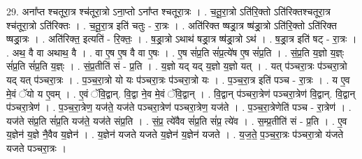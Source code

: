 \documentclass[17pt]{extarticle}
\begin{document}
29. अना᳚प्त श्चतूरा॒त्र श्च॑तूरा॒त्रो ऽना॒प्तो ऽना᳚प्त श्चतूरा॒त्रः । . च॒तू॒रा॒त्रो ऽति॑रि॒क्तो ऽति॑रिक्तश्चतूरा॒त्र श्च॑तूरा॒त्रो ऽति॑रिक्तः । . च॒तू॒रा॒त्र इति॑ चतुः - रा॒त्रः । . अति॑रिक्त ष्षड्रा॒त्र ष्ष॑ड्रा॒त्रो ऽति॑रि॒क्तो ऽति॑रिक्त ष्षड्रा॒त्रः । . अति॑रिक्त॒ इत्यति॑ - रि॒क्तः॒ । . ष॒ड्रा॒त्रो ऽथाथ॑ षड्रा॒त्र ष्ष॑ड्रा॒त्रो ऽथ॑ । . ष॒ड्रा॒त्र इति॑ षट् - रा॒त्रः । . अथ॒ वै वा अथाथ॒ वै । . वा ए॒ष ए॒ष वै वा ए॒षः । . ए॒ष सं॑प्र॒ति सं॑प्र॒त्ये॑ष ए॒ष सं॑प्र॒ति । . सं॒प्र॒ति य॒ज्ञो य॒ज्ञ्ः सं॑प्र॒ति सं॑प्र॒ति य॒ज्ञ्ः । . सं॒प्र॒तीति॑ सं - प्र॒ति । . य॒ज्ञो यद् यद् य॒ज्ञो य॒ज्ञो यत् । . यत् प॑ञ्चरा॒त्रः प॑ञ्चरा॒त्रो यद् यत् प॑ञ्चरा॒त्रः । . प॒ञ्च॒रा॒त्रो यो यः प॑ञ्चरा॒त्रः प॑ञ्चरा॒त्रो यः । . प॒ञ्च॒रा॒त्र इति॑ पञ्च - रा॒त्रः । . य ए॒व मे॒वं ॅयो य ए॒वम् । . ए॒वं ॅवि॒द्वान्. वि॒द्वा ने॒व मे॒वं ॅवि॒द्वान् । . वि॒द्वान् प॑ञ्चरा॒त्रेण॑ पञ्चरा॒त्रेण॑ वि॒द्वान्. वि॒द्वान् प॑ञ्चरा॒त्रेण॑ । . प॒ञ्च॒रा॒त्रेण॒ यज॑ते॒ यज॑ते पञ्चरा॒त्रेण॑ पञ्चरा॒त्रेण॒ यज॑ते । . प॒ञ्च॒रा॒त्रेणेति॑ पञ्च - रा॒त्रेण॑ । . यज॑ते संप्र॒ति सं॑प्र॒ति यज॑ते॒ यज॑ते संप्र॒ति । . सं॒प्र॒ त्ये॑वैव सं॑प्र॒ति सं॑प्र॒ त्ये॑व । . स॒म्प्र॒तीति॑ सं - प्र॒ति । . ए॒व य॒ज्ञेन॑ य॒ज्ञे नै॒वैव य॒ज्ञेन॑ । . य॒ज्ञेन॑ यजते यजते य॒ज्ञेन॑ य॒ज्ञेन॑ यजते । . य॒ज॒ते॒ प॒ञ्च॒रा॒त्रः प॑ञ्चरा॒त्रो य॑जते यजते पञ्चरा॒त्रः । \newline
\end{document}
